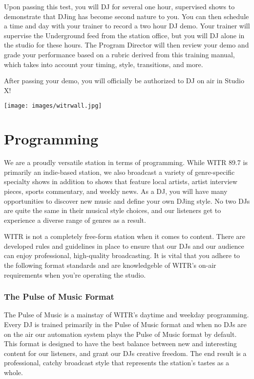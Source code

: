 \documentclass{witrman}
\begin{document}
Upon passing this test, you will DJ for several one hour, supervised shows to
demonstrate that DJing has become second nature to you.  You can then schedule a
time and day with your trainer to record a two hour DJ demo.  Your trainer will
supervise the Underground feed from the station office, but you will DJ alone in
the studio for these hours.  The Program Director will then review your demo and
grade your performance based on a rubric derived from this training manual,
which takes into account your timing, style, transitions, and more.

After passing your demo, you will officially be authorized to DJ on air in
Studio X\@!

\texttt{[image: images/witrwall.jpg]}

\chapter{Programming}

We are a proudly versatile station in terms of programming.  While WITR 89.7 is
primarily an indie-based station, we also broadcast a variety of genre-specific
specialty shows in addition to shows that feature local artists, artist
interview pieces, sports commentary, and weekly news.  As a DJ, you will have
many opportunities to discover new music and define your own DJing style.
No two DJs are quite the same in their musical style choices,
and our listeners get to experience a diverse range of genres as a result.

WITR is not a completely free-form station when it comes to content.  There are
developed rules and guidelines in place to ensure that our DJs and our audience
can enjoy professional, high-quality broadcasting.  It is vital that you adhere
to the following format standards and are knowledgeble of WITR's on-air requirements
when you're operating the studio.

\subsection{The Pulse of Music Format}

The Pulse of Music is a mainstay of WITR's daytime and weekday programming.
Every DJ is trained primarily in the Pulse of Music format and when no DJs are 
on the air our automation system plays the Pulse of Music format by default.
This format is designed to have the best balance between
new and interesting content for our listeners, and grant our DJs creative freedom.
The end result is a professional, catchy broadcast style that
represents the station's tastes as a whole.
\end{document}
